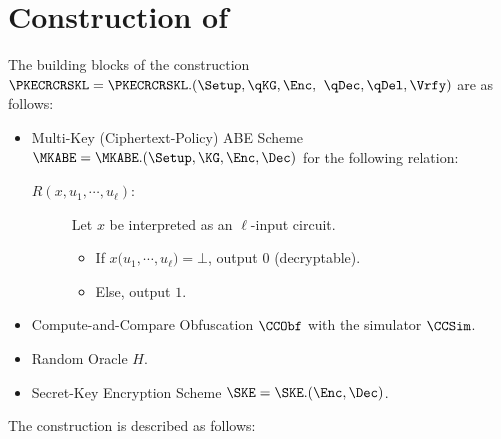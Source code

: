 \section{Construction of \tPKECRCRSKL}

\begin{comment}
\nikhil{They seem to build (Adaptive-Secure) (Multi-Input) (Predicate) Encryption for polynomial arity for P. All three prefixes are stronger than what we need, which is (Selective-Secure) (Multi-Key) (Attribute-Based) Encryption.}
\end{comment}

The building blocks of the construction
$\PKECRCRSKL = \PKECRCRSKL.(\Setup, \qKG, \Enc,$ 
$\qDec, \qDel, \Vrfy)$ are as follows:

\begin{itemize}
\item Multi-Key (Ciphertext-Policy) ABE Scheme $\MKABE =
\MKABE.(\Setup, \KG, \Enc, \Dec)$ for the following relation:

\begin{description}
\item[$R(x, u_1, \cdots, u_\ell)$:] Let $x$ be
interpreted as an $\ell$-input circuit.
\begin{itemize}
\item If $x\big(u_1, \cdots, u_\ell) = \bot$, output $0$
(decryptable).
\item Else, output $1$.
\end{itemize}
\end{description}

\item Compute-and-Compare Obfuscation $\CCObf$ with the simulator
$\CCSim$.

\item Random Oracle $H$.

\item Secret-Key Encryption Scheme $\SKE = \SKE.(\Enc,
\Dec)$.
\end{itemize}

The construction is described as follows:

